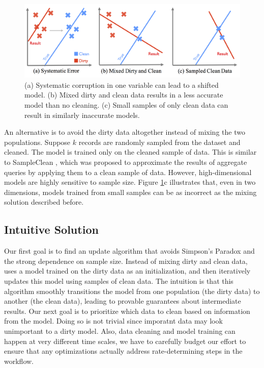 \begin{figure}[ht!]
\centering
 \includegraphics[width=\columnwidth]{figs/update-arch.png}
 \caption{(a) Systematic corruption in one variable can lead to a shifted model. 
 (b) Mixed dirty and clean data results in a less accurate model than no cleaning.
(c) Small samples of only clean data can result in similarly inaccurate models. \label{update-arch1}}
\end{figure}

An alternative is to avoid the dirty data altogether instead of mixing the two populations.
Suppose $k$ records are randomly sampled from the dataset and cleaned.
The model is trained only on the cleaned sample of data.
This is similar to SampleClean \cite{wang1999sample}, which was proposed to approximate the results of aggregate queries by applying them to a clean sample of data.
However, high-dimensional models are highly sensitive to sample size.
Figure \ref{update-arch1}c illustrates that, even in two dimensions, models trained from small samples can be as incorrect as the mixing solution described before.

\subsection{Intuitive Solution}
Our first goal is to find an update algorithm that avoids Simpson's Paradox and the strong dependence on sample size.
Instead of mixing dirty and clean data, \sys uses a model trained on the dirty data as an initialization, and then iteratively updates this model using samples of clean data.
The intuition is that this algorithm smoothly transitions the model from one population (the dirty data) to another (the clean data), leading to provable guarantees about intermediate results.
Our next goal is to prioritize which data to clean based on information from the model.
Doing so is not trivial since imporatnt data may look unimportant to a dirty model.
Also, data cleaning and model training can happen at very different time scales, we have to carefully budget our effort to ensure that any optimizations actually address rate-determining steps in the workflow.

